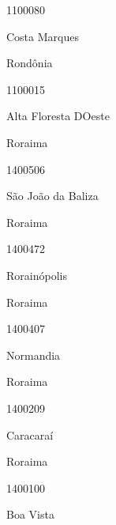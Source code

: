 \documentclass[
  letterpaper,
]{report}
\begin{document}
1100080

\n      

Costa Marques

\n    

\n    

\n      

Rondônia

\n      

1100015

\n      

Alta Floresta D\textquotesingle Oeste

\n    

\n    

\n      

Roraima

\n      

1400506

\n      

São João da Baliza

\n    

\n    

\n      

Roraima

\n      

1400472

\n      

Rorainópolis

\n    

\n    

\n      

Roraima

\n      

1400407

\n      

Normandia

\n    

\n    

\n      

Roraima

\n      

1400209

\n      

Caracaraí

\n    

\n    

\n      

Roraima

\n      

1400100

\n      

Boa Vista

\n    
\end{document}
